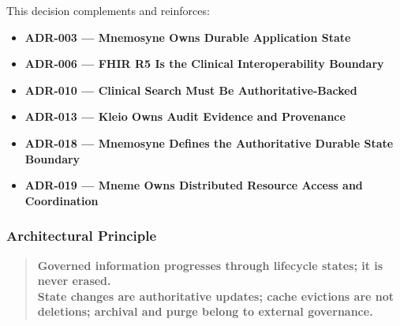 This decision complements and reinforces:
\begin{itemize}
    \item \textbf{ADR-003 --- Mnemosyne Owns Durable Application State}
    \item \textbf{ADR-006 --- FHIR R5 Is the Clinical Interoperability Boundary}
    \item \textbf{ADR-010 --- Clinical Search Must Be Authoritative-Backed}
    \item \textbf{ADR-013 --- Kleio Owns Audit Evidence and Provenance}
    \item \textbf{ADR-018 --- Mnemosyne Defines the Authoritative Durable State Boundary}
    \item \textbf{ADR-019 --- Mneme Owns Distributed Resource Access and Coordination}
\end{itemize}

\subsubsection{Architectural Principle}

\begin{quote}
    \textbf{Governed information progresses through lifecycle states; it is never erased.}\\
    \textbf{State changes are authoritative updates; cache evictions are not deletions; archival and purge belong to external governance.}
\end{quote}

